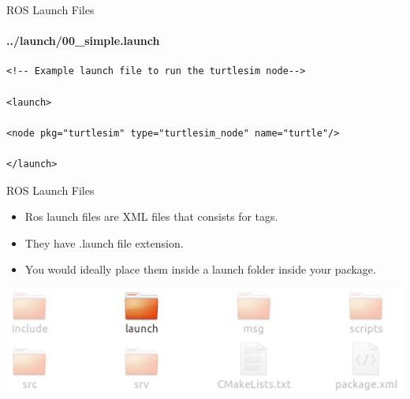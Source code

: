\documentclass{beamer}
\begin{document}
\begin{frame}[fragile]{ROS Launch Files}
    \framesubtitle{../launch/00\_simple.launch}
    \begin{lstlisting}
<!-- Example launch file to run the turtlesim node-->

<launch>

<node pkg="turtlesim" type="turtlesim_node" name="turtle"/>

</launch>
    \end{lstlisting}
\end{frame}


\begin{frame}{ROS Launch Files}
    \begin{itemize}
        \item Ros launch files are XML files that consists for tags.
        
        \item They have {\ttfamily \colorbox{gray!30!white}{.launch}} file extension.
        
        \item You would ideally place them inside a {\ttfamily \colorbox{gray!30!white}{launch}} folder inside your package.
    \end{itemize}  
    \includegraphics[width=1.0\linewidth]{figures/package2.png}
\end{frame}
\end{document}
